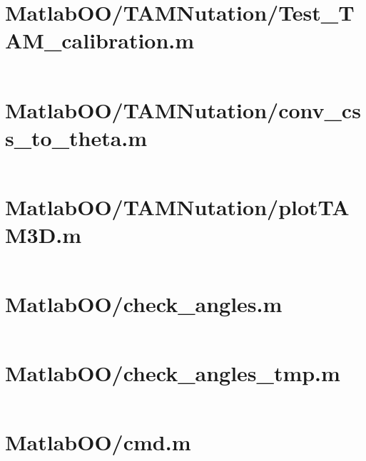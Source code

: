 \pagebreak
\section{MatlabOO/TAMNutation/Test\_TAM\_calibration.m}\label{code:MatlabOO/TAMNutation/Test_TAM_calibration.m}
\inputminted[linenos,fontsize=\scriptsize]{matlab}{/home/dcouture/git/mathyourlife/TSatPy/beta_versions/matlab_object_oriented/TAMNutation/Test_TAM_calibration.m}

\pagebreak
\section{MatlabOO/TAMNutation/conv\_css\_to\_theta.m}\label{code:MatlabOO/TAMNutation/conv_css_to_theta.m}
\inputminted[linenos,fontsize=\scriptsize]{matlab}{/home/dcouture/git/mathyourlife/TSatPy/beta_versions/matlab_object_oriented/TAMNutation/conv_css_to_theta.m}

\pagebreak
\section{MatlabOO/TAMNutation/plotTAM3D.m}\label{code:MatlabOO/TAMNutation/plotTAM3D.m}
\inputminted[linenos,fontsize=\scriptsize]{matlab}{/home/dcouture/git/mathyourlife/TSatPy/beta_versions/matlab_object_oriented/TAMNutation/plotTAM3D.m}

\pagebreak
\section{MatlabOO/check\_angles.m}\label{code:MatlabOO/check_angles.m}
\inputminted[linenos,fontsize=\scriptsize]{matlab}{/home/dcouture/git/mathyourlife/TSatPy/beta_versions/matlab_object_oriented/check_angles.m}

\pagebreak
\section{MatlabOO/check\_angles\_tmp.m}\label{code:MatlabOO/check_angles_tmp.m}
\inputminted[linenos,fontsize=\scriptsize]{matlab}{/home/dcouture/git/mathyourlife/TSatPy/beta_versions/matlab_object_oriented/check_angles_tmp.m}

\pagebreak
\section{MatlabOO/cmd.m}\label{code:MatlabOO/cmd.m}
\inputminted[linenos,fontsize=\scriptsize]{matlab}{/home/dcouture/git/mathyourlife/TSatPy/beta_versions/matlab_object_oriented/cmd.m}

